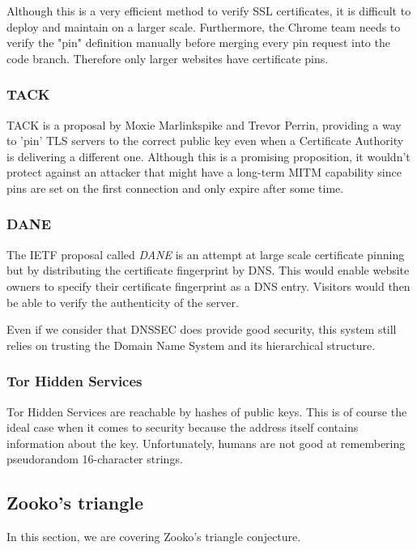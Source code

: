 \documentclass{vldb}
\begin{document}
Although this is a very efficient method to verify SSL certificates, it is difficult to deploy and maintain on a larger scale. Furthermore, the Chrome team needs to verify the "pin" definition manually before merging every pin request into the code branch. Therefore only larger websites have certificate pins.

\subsubsection{TACK}

TACK is a proposal by Moxie Marlinkspike and Trevor Perrin, providing a way to 'pin' TLS servers to the correct public key even when a Certificate Authority is delivering a different one. Although this is a promising proposition, it wouldn't protect against an attacker that might have a long-term MITM capability since pins are set on the first connection and only expire after some time.\cite{tackMITM}

\subsubsection{DANE}

The IETF proposal called \emph{DANE} is an attempt at large scale certificate pinning but by distributing the certificate fingerprint by DNS. This would enable website owners to specify their certificate fingerprint as a DNS entry. Visitors would then be able to verify the authenticity of the server.

Even if we consider that DNSSEC does provide good security, this system still relies on trusting the Domain Name System and its hierarchical structure.

\subsubsection{Tor Hidden Services}

Tor Hidden Services are reachable by hashes of public keys. This is of course the ideal case when it comes to security because the address itself contains information about the key. Unfortunately, humans are not good at remembering pseudorandom 16-character strings.

\subsection{Zooko's triangle}
In this section, we are covering Zooko's triangle conjecture.
\end{document}
